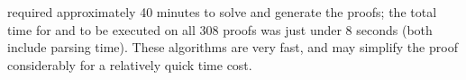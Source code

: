 



{\SPASS} required approximately 40 minutes to solve and generate the proofs; the total time for {\GFOLU} and {\FORPI} to be executed on all 308 proofs was just under 8 seconds (both include parsing time). These algorithms are very fast, and may simplify the proof considerably for a relatively quick time cost.

